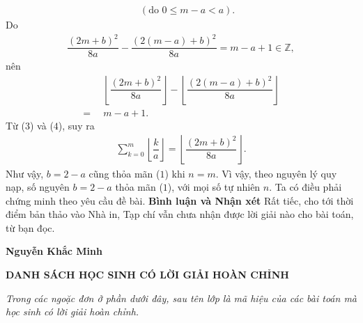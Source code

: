 \begin{multicols}{2}
\begin{align*}
			&\,\,\,(\text{do } 0 \le m-a < a).
	\end{align*}
	Do
	\begin{align*}
		\dfrac{{{{\left( {2m \!+\! b} \right)}^2}}}{{8a}} \!-\! \dfrac{{{{\left( {2\left( {m \!-\! a} \right) \!+\! b} \right)}^2}}}{{8a}} \!=\! m \!-\! a \!+\! 1 \!\in\! \mathbb{Z},
	\end{align*}
	nên
	\begin{align*}
		&\left\lfloor {\dfrac{{{{\left( {2m + b} \right)}^2}}}{{8a}}} \right\rfloor - \left\lfloor {\dfrac{{{{\left( {2\left( {m - a} \right) + b} \right)}^2}}}{{8a}}} \right\rfloor \\
		= \,\,\,&m - a + 1. \tag{$4$}
	\end{align*}
	Từ ($3$) và ($4$), suy ra
	\begin{align*}
		\sum\limits_{k = 0}^m {\left\lfloor {\dfrac{k}{a}} \right\rfloor}  = \left\lfloor {\dfrac{{{{\left( {2m + b} \right)}^2}}}{{8a}}} \right\rfloor.
	\end{align*}
	Như vậy, $b = 2 - a$ cũng thỏa mãn ($1$) khi $n = m$.
	\vskip 0.05cm
	Vì vậy, theo nguyên lý quy nạp, số nguyên $b = 2 - a$ thỏa mãn ($1$), với mọi số tự nhiên $n$.
	\vskip 0.05cm
	Ta có điều phải chứng minh theo yêu cầu đề bài.
	\vskip 0.05cm
	\textbf{\color{thachthuctoanhoc}Bình luận và Nhận xét}
	\vskip 0.05cm
	Rất tiếc, cho tới thời điểm bản thảo vào Nhà in, Tạp chí vẫn chưa nhận được lời giải nào cho bài toán, từ bạn đọc.
	\begin{flushright}
		\textbf{\color{thachthuctoanhoc}Nguyễn Khắc Minh}
	\end{flushright}
\end{multicols}	
\newpage
\centerline{\textbf{\color{thachthuctoanhoc}DANH SÁCH HỌC SINH CÓ LỜI GIẢI HOÀN CHỈNH}}
\vskip 0.05cm
\textit{Trong các ngoặc đơn ở phần dưới đây, sau tên lớp là mã hiệu của các bài toán mà học sinh có lời giải hoàn chỉnh.}
